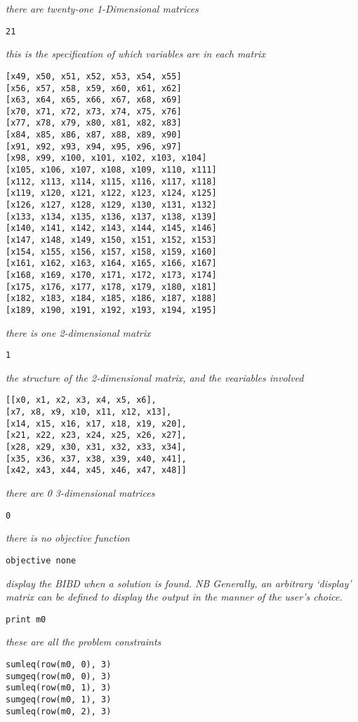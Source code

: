 \documentclass{article}
\begin{document}
\begin{small}
\emph{there are twenty-one 1-Dimensional matrices}
\begin{verbatim}
21
\end{verbatim}
\emph{this is the specification of which variables are in each matrix}
\begin{verbatim}
[x49, x50, x51, x52, x53, x54, x55]
[x56, x57, x58, x59, x60, x61, x62]
[x63, x64, x65, x66, x67, x68, x69]
[x70, x71, x72, x73, x74, x75, x76]
[x77, x78, x79, x80, x81, x82, x83]
[x84, x85, x86, x87, x88, x89, x90]
[x91, x92, x93, x94, x95, x96, x97]
[x98, x99, x100, x101, x102, x103, x104]
[x105, x106, x107, x108, x109, x110, x111]
[x112, x113, x114, x115, x116, x117, x118]
[x119, x120, x121, x122, x123, x124, x125]
[x126, x127, x128, x129, x130, x131, x132]
[x133, x134, x135, x136, x137, x138, x139]
[x140, x141, x142, x143, x144, x145, x146]
[x147, x148, x149, x150, x151, x152, x153]
[x154, x155, x156, x157, x158, x159, x160]
[x161, x162, x163, x164, x165, x166, x167]
[x168, x169, x170, x171, x172, x173, x174]
[x175, x176, x177, x178, x179, x180, x181]
[x182, x183, x184, x185, x186, x187, x188]
[x189, x190, x191, x192, x193, x194, x195]
\end{verbatim}
\emph{there is one 2-dimensional matrix}
\begin{verbatim}
1
\end{verbatim}
\emph{the structure of the 2-dimensional matrix, and the veariables involved}
\begin{verbatim}
[[x0, x1, x2, x3, x4, x5, x6],
[x7, x8, x9, x10, x11, x12, x13],
[x14, x15, x16, x17, x18, x19, x20],
[x21, x22, x23, x24, x25, x26, x27],
[x28, x29, x30, x31, x32, x33, x34],
[x35, x36, x37, x38, x39, x40, x41],
[x42, x43, x44, x45, x46, x47, x48]]
\end{verbatim}
\emph{there are 0 3-dimensional matrices}
\begin{verbatim}
0
\end{verbatim}
\emph{there is no objective function}
\begin{verbatim}
objective none
\end{verbatim}
\emph{display the BIBD when a solution is found. NB Generally, an arbitrary
`display' matrix can be defined to display the output in the manner of the
user's choice.}
\begin{verbatim}
print m0
\end{verbatim}
\emph{these are all the problem constraints}
\begin{verbatim}
sumleq(row(m0, 0), 3)
sumgeq(row(m0, 0), 3)
sumleq(row(m0, 1), 3)
sumgeq(row(m0, 1), 3)
sumleq(row(m0, 2), 3)

\end{verbatim}
\end{small}
\end{document}
